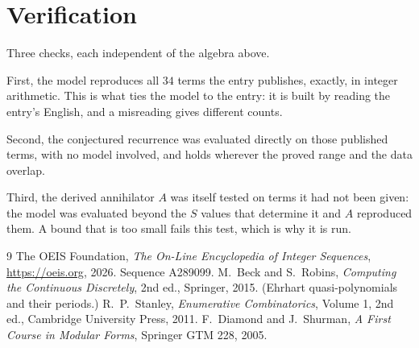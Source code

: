 \documentclass[11pt,a4paper]{article}
\theoremstyle{plain}
\theoremstyle{definition}
\begin{document}
\section{Verification}

Three checks, each independent of the algebra above.

First, the model reproduces all $34$ terms the entry publishes, exactly, in integer
arithmetic. This is what ties the model to the entry: it is built by reading the entry's
English, and a misreading gives different counts.

Second, the conjectured recurrence was evaluated directly on those published terms, with no
model involved, and holds wherever the proved range and the data overlap.

Third, the derived annihilator $A$ was itself tested on terms it had not been given: the model
was evaluated beyond the $S$ values that determine it and $A$ reproduced them. A bound that is
too small fails this test, which is why it is run.

\begin{thebibliography}{9}
 The OEIS Foundation, \emph{The On-Line Encyclopedia of Integer
Sequences}, \url{https://oeis.org}, 2026. Sequence A289099.
 M.~Beck and S.~Robins, \emph{Computing the Continuous Discretely},
2nd ed., Springer, 2015. (Ehrhart quasi-polynomials and their periods.)
 R.~P.~Stanley, \emph{Enumerative Combinatorics}, Volume 1, 2nd ed.,
Cambridge University Press, 2011.
 F.~Diamond and J.~Shurman, \emph{A First Course in Modular Forms},
Springer GTM 228, 2005.
\end{thebibliography}
\end{document}
